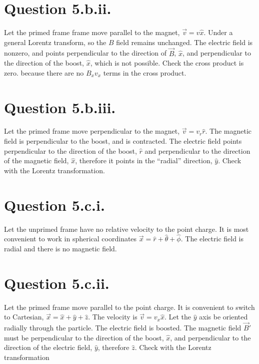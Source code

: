 \documentclass{article}
\begin{document}
\section*{Question 5.b.ii.}
Let the primed frame frame move parallel to the magnet, $\vec{v}=v\hat{x}$. Under a general Lorentz transform,
so the $B$ field remains unchanged. The electric field is nonzero, and points perpendicular to the direction of $\vec{B}$, $\hat{x}$, and perpendicular to the direction of the boost, $\hat{x}$, which is not possible. Check the cross product is zero.
because there are no $B_x v_x$ terms in the cross product.
\section*{Question 5.b.iii.}
Let the primed frame move perpendicular to the magnet, $\vec{v}=v_r\hat{r}$. The magnetic field is perpendicular to the boost, and is contracted. The electric field points perpendicular to the direction of the boost, $\hat{r}$ and perpendicular to the direction of the magnetic field, $\hat{x}$, therefore it points in the ``radial'' direction, $\hat{y}$. Check with the Lorentz transformation.
\section*{Question 5.c.i.}
Let the unprimed frame have no relative velocity to the point charge. It is most convenient to work in spherical coordinates $\vec{x}=\hat{r}+\hat{\theta}+\hat{\phi}$. The electric field is radial and there is no magnetic field.
\section*{Question 5.c.ii.}
Let the primed frame move parallel to the point charge. It is convenient to switch to Cartesian, $\vec{x}=\hat{x}+\hat{y}+\hat{z}$. The velocity is $\vec{v}=v_x\hat{x}$. Let the $\hat{y}$ axis be oriented radially through the particle. The electric field is boosted.
The magnetic field $\vec{B}'$ must be perpendicular to the direction of the boost, $\hat{x}$, and perpendicular to the direction of the electric field, $\hat{y}$, therefore $\hat{z}$. Check with the Lorentz transformation
\end{document}
